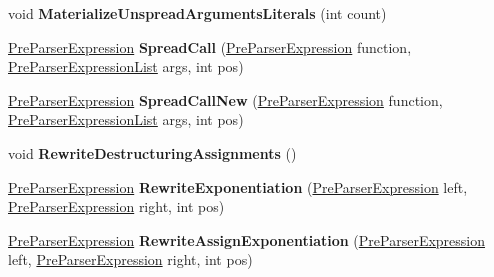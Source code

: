 \begin{DoxyCompactItemize}
\item 
void {\bfseries Materialize\+Unspread\+Arguments\+Literals} (int count)\hypertarget{classv8_1_1internal_1_1_pre_parser_traits_a8294dc9a46aa648b6e93f533324d8511}{}\label{classv8_1_1internal_1_1_pre_parser_traits_a8294dc9a46aa648b6e93f533324d8511}

\item 
\hyperlink{classv8_1_1internal_1_1_pre_parser_expression}{Pre\+Parser\+Expression} {\bfseries Spread\+Call} (\hyperlink{classv8_1_1internal_1_1_pre_parser_expression}{Pre\+Parser\+Expression} function, \hyperlink{classv8_1_1internal_1_1_pre_parser_list}{Pre\+Parser\+Expression\+List} args, int pos)\hypertarget{classv8_1_1internal_1_1_pre_parser_traits_a7a0ccb847653b23874ede7f45e680a80}{}\label{classv8_1_1internal_1_1_pre_parser_traits_a7a0ccb847653b23874ede7f45e680a80}

\item 
\hyperlink{classv8_1_1internal_1_1_pre_parser_expression}{Pre\+Parser\+Expression} {\bfseries Spread\+Call\+New} (\hyperlink{classv8_1_1internal_1_1_pre_parser_expression}{Pre\+Parser\+Expression} function, \hyperlink{classv8_1_1internal_1_1_pre_parser_list}{Pre\+Parser\+Expression\+List} args, int pos)\hypertarget{classv8_1_1internal_1_1_pre_parser_traits_aa4d171f9abbcfb17b17889b46627a984}{}\label{classv8_1_1internal_1_1_pre_parser_traits_aa4d171f9abbcfb17b17889b46627a984}

\item 
void {\bfseries Rewrite\+Destructuring\+Assignments} ()\hypertarget{classv8_1_1internal_1_1_pre_parser_traits_ab58b230c845ff929a710795b5220ecab}{}\label{classv8_1_1internal_1_1_pre_parser_traits_ab58b230c845ff929a710795b5220ecab}

\item 
\hyperlink{classv8_1_1internal_1_1_pre_parser_expression}{Pre\+Parser\+Expression} {\bfseries Rewrite\+Exponentiation} (\hyperlink{classv8_1_1internal_1_1_pre_parser_expression}{Pre\+Parser\+Expression} left, \hyperlink{classv8_1_1internal_1_1_pre_parser_expression}{Pre\+Parser\+Expression} right, int pos)\hypertarget{classv8_1_1internal_1_1_pre_parser_traits_a2c63c30137f3513930bca43ceb4eb368}{}\label{classv8_1_1internal_1_1_pre_parser_traits_a2c63c30137f3513930bca43ceb4eb368}

\item 
\hyperlink{classv8_1_1internal_1_1_pre_parser_expression}{Pre\+Parser\+Expression} {\bfseries Rewrite\+Assign\+Exponentiation} (\hyperlink{classv8_1_1internal_1_1_pre_parser_expression}{Pre\+Parser\+Expression} left, \hyperlink{classv8_1_1internal_1_1_pre_parser_expression}{Pre\+Parser\+Expression} right, int pos)\hypertarget{classv8_1_1internal_1_1_pre_parser_traits_ae88731380430d686a0f8c4491c509ef5}{}\label{classv8_1_1internal_1_1_pre_parser_traits_ae88731380430d686a0f8c4491c509ef5}


\end{DoxyCompactItemize}
